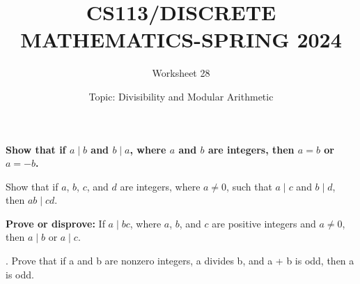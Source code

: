 \documentclass{exam}
\title{CS113/DISCRETE MATHEMATICS-SPRING 2024}
\author{Worksheet 28}
\date{Topic:  Divisibility and Modular Arithmetic  }
\begin{document}
\maketitle
\vspace{5mm}
\begin{center}
\end{center}
\vspace{5mm}


\vspace{5mm}

\vspace{5mm}




\begin{questions}

\question
\textbf{Show that if \(a \mid b\) and \(b \mid a\), where \(a\) and \(b\) are integers, then \(a = b\) or \(a = -b\).}


\newpage


\question Show that if \(a\), \(b\), \(c\), and \(d\) are integers, where \(a \neq 0\), such that \(a \mid c\) and \(b \mid d\), then \(ab \mid cd\).

\newpage

\question
\textbf{Prove or disprove:} If $a \mid bc$, where $a$, $b$, and $c$ are positive integers and $a \neq 0$, then $a \mid b$ or $a \mid c$.
\newpage

\question
. Prove that if a and b are nonzero integers, a divides b,
and a + b is odd, then a is odd.
\newpage

\end{questions}
\end{document}
